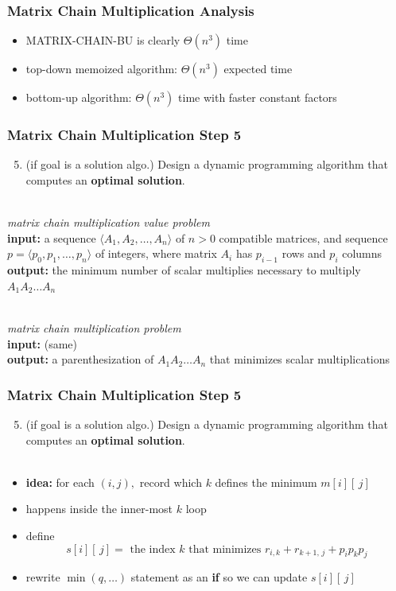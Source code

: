 \documentclass{beamer}
\newcommand{\stanza}{ \\~\ }
\begin{document}
\begin{frame} \frametitle{Matrix Chain Multiplication Analysis}
  \begin{itemize}
    \item MATRIX-CHAIN-BU is clearly $\Theta(n^3)$ time
    \item top-down memoized algorithm: $\Theta(n^3)$ expected time
    \item bottom-up algorithm: $\Theta(n^3)$ time with faster constant factors
  \end{itemize}
\end{frame}

\begin{frame} \frametitle{Matrix Chain Multiplication Step 5}
  \begin{enumerate}
    \setcounter{enumi}{4}
    \item (if goal is a solution algo.) Design a dynamic programming algorithm that computes an \textbf{optimal solution}.
    \stanza
  \end{enumerate}

  \emph{matrix chain multiplication value problem} \\
  \textbf{input:} a sequence $\langle A_1, A_2, \ldots, A_n \rangle$ of $n>0$ compatible matrices,
    and sequence $p=\langle p_0, p_1, \ldots, p_n \rangle$ of integers, where
    matrix $A_i$ has $p_{i-1}$ rows and $p_i$ columns \\
  \textbf{output:} the minimum number of scalar multiplies necessary to multiply $A_1 A_2 \ldots A_n$ 
  \stanza

  \emph{matrix chain multiplication problem} \\
  \textbf{input:} (same) \\
  \textbf{output:} a parenthesization of $A_1 A_2 \ldots A_n$ that minimizes scalar multiplications

\end{frame}

\begin{frame} \frametitle{Matrix Chain Multiplication Step 5}
  \begin{enumerate}
    \setcounter{enumi}{4}
    \item (if goal is a solution algo.) Design a dynamic programming algorithm that computes an \textbf{optimal solution}.
    \stanza
  \end{enumerate}

  \begin{itemize}
    \item \textbf{idea:} for each $(i, j),$ record which $k$ defines the minimum $m[i][\, j]$
    \item happens inside the inner-most $k$ loop
    \item define
      \[ s[i][\, j] = \text{ the index } k \text{ that minimizes } r_{i, k} + r_{k+1, \, j} + p_i p_k p_j  \]
    \item rewrite $\min(q, \ldots)$ statement as an \textbf{if} so we can update $s[i][\, j]$
  \end{itemize}
\end{frame}
\end{document}
